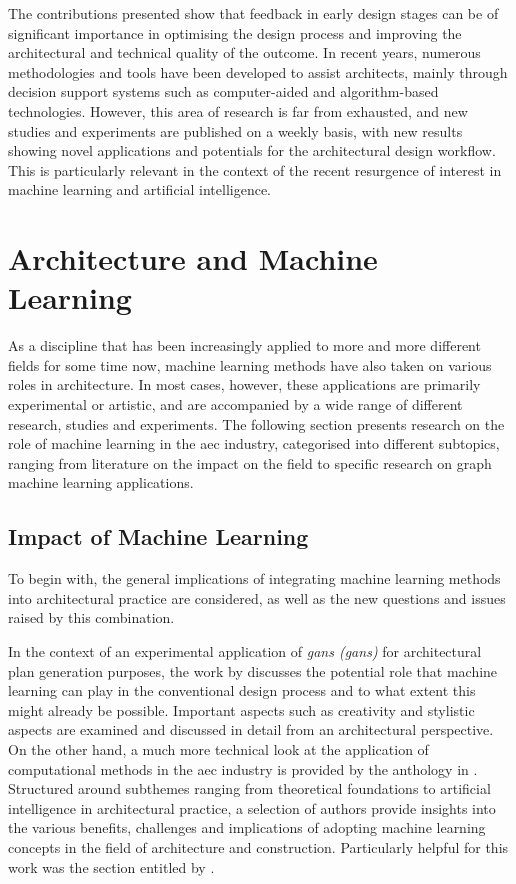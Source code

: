 \documentclass[a4paper, 12pt]{report}
\begin{document}
The contributions presented show that feedback in early design stages can be of significant importance in optimising the design process and improving the architectural and technical quality of the outcome. In recent years, numerous methodologies and tools have been developed to assist architects, mainly through decision support systems such as computer-aided and algorithm-based technologies. However, this area of research is far from exhausted, and new studies and experiments are published on a weekly basis, with new results showing novel applications and potentials for the architectural design workflow. This is particularly relevant in the context of the recent resurgence of interest in machine learning and artificial intelligence.

\section{Architecture and Machine Learning}\label{sec:architecture-and-machine-learning}

As a discipline that has been increasingly applied to more and more different fields for some time now, machine learning methods have also taken on various roles in architecture. In most cases, however, these applications are primarily experimental or artistic, and are accompanied by a wide range of different research, studies and experiments. The following section presents research on the role of machine learning in the \acrshort{aec} industry, categorised into different subtopics, ranging from literature on the impact on the field to specific research on graph machine learning applications.

\subsection{Impact of Machine Learning}\label{subsec:impact-of-machine-learning}

To begin with, the general implications of integrating machine learning methods into architectural practice are considered, as well as the new questions and issues raised by this combination.

In the context of an experimental application of \textit{\acrlong{gans} (\acrshort{gans})} for architectural plan generation purposes, the work  by \citeauthor{campo2020how} discusses the potential role that machine learning can play in the conventional design process and to what extent this might already be possible. Important aspects such as creativity and stylistic aspects are examined and discussed in detail from an architectural perspective. On the other hand, a much more technical look at the application of computational methods in the \acrshort{aec} industry is provided by the anthology  in \citeyear{as2021routledge}. Structured around subthemes ranging from theoretical foundations to artificial intelligence in architectural practice, a selection of authors provide insights into the various benefits, challenges and implications of adopting machine learning concepts in the field of architecture and construction. Particularly helpful for this work was the section entitled  by \citeauthor{nagy2021ai}.
\end{document}
